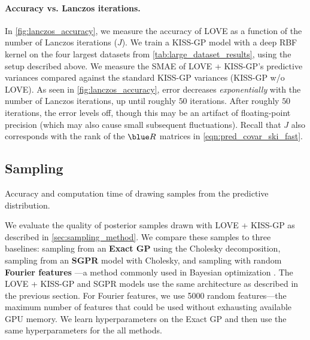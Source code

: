 \paragraph{Accuracy vs. Lanczos iterations.}
In \cref{fig:lanczos_accuracy}, we measure the accuracy of LOVE{} as a function of the number of Lanczos iterations ($J$).
We train a KISS-GP model with a deep RBF kernel on the four largest datasets from \cref{tab:large_dataset_results}, using the setup described above.
We measure the SMAE of LOVE + KISS-GP's predictive variances compared against the standard KISS-GP variances (KISS-GP w/o LOVE).
As seen in \cref{fig:lanczos_accuracy}, error decreases \emph{exponentially} with the number of Lanczos iterations, up until roughly $50$ iterations.
After roughly $50$ iterations, the error levels off, though this may be an artifact of floating-point precision (which may also cause small subsequent fluctuations).
Recall that $J$ also corresponds with the rank of the $\blue \bR$ matrices in \cref{eqn:pred_covar_ski_fast}.



\subsection{Sampling}

\begin{table}[t!]
  \caption[Accuracy and computation time of drawing samples from the predictive distribution.]{
    Accuracy and computation time of drawing samples from the predictive distribution.
    \label{tab:sampling_results}
  }
  \vspace{0.5ex}
  \centering
  \resizebox{\textwidth}{!}{%
    
  }
  \vspace{1em}

  \resizebox{\textwidth}{!}{%
    
  }
\end{table}

We evaluate the quality of posterior samples drawn with LOVE + KISS-GP{} as described in \cref{sec:sampling_method}.
We compare these samples to three baselines: sampling from an {\bf Exact GP} using the Cholesky decomposition, sampling from an {\bf SGPR} model with Cholesky, and sampling with random {\bf Fourier features} \citep{rahimi2008random}---a method commonly used in Bayesian optimization \cite{hernandez2014predictive,wang2017max}.
The LOVE + KISS-GP{} and SGPR models use the same architecture as described in the previous section.
For Fourier features, we use 5000 random features---the maximum number of features that could be used without exhausting available GPU memory.
We learn hyperparameters on the Exact GP and then use the same hyperparameters for the all methods.

